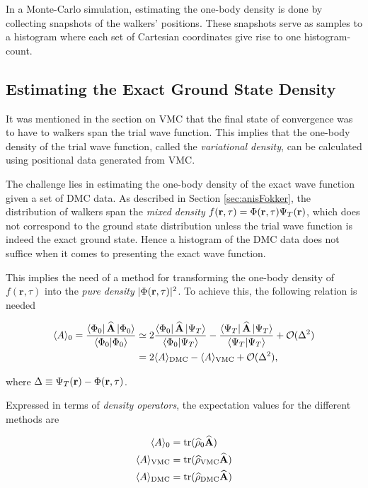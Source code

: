 In a Monte-Carlo simulation, estimating the one-body density is done by collecting snapshots of the walkers' positions. These snapshots serve as samples to a histogram where each set of Cartesian coordinates give rise to one histogram-count.

\subsection{Estimating the Exact Ground State Density}

It was mentioned in the section on VMC that the final state of convergence was to have to walkers span the trial wave function. This implies that the one-body density of the trial wave function, called the \textit{variational density}, can be calculated using positional data generated from VMC.

The challenge lies in estimating the one-body density of the exact wave function given a set of DMC data. As described in Section \ref{sec:anisFokker}, the distribution of walkers span the \textit{mixed density} $f(\mathbf{r}, \tau) = \Phi(\mathbf{r}, \tau)\Psi_T(\mathbf{r})$, which does not correspond to the ground state distribution unless the trial wave function is indeed the exact ground state. Hence a histogram of the DMC data does not suffice when it comes to presenting the exact wave function.

This implies the need of a method for transforming the one-body density of $f(\mathbf{r}, \tau)$ into the \textit{pure density} $|\Phi(\mathbf{r}, \tau)|^2$. To achieve this, the following relation is needed \cite{abInitioMC}

\begin{align}
 \langle A \rangle_0 = \frac{\left< \Phi_0 \right|{\bf\widehat{A}}\left| \Phi_0 \right>}{\left\langle \Phi_0 | \Phi_0\right\rangle} &\simeq  2\frac{\left< \Phi_0 \right|{\bf\widehat{A}}\left| \Psi_T \right>}{\left\langle \Phi_0 | \Psi_T\right\rangle} -  \frac{\left< \Psi_T \right|{\bf\widehat{A}}\left| \Psi_T \right>}{\left\langle \Psi_T | \Psi_T\right\rangle} + \mathcal{O}(\Delta^2)\notag\\
  &= 2\langle A \rangle_\mathrm{DMC} - \langle A \rangle_\mathrm{VMC}  + \mathcal{O}(\Delta^2), \label{eq:PureEstimRelat}
\end{align}

where $\Delta \equiv \Psi_T(\mathbf{r}) - \Phi(\mathbf{r}, \tau)$. 

Expressed in terms of \textit{density operators}, the expectation values for the different methods are \cite{leinaas}

\newcommand{\tr}{\mathrm{tr}}

\begin{align*}
 \langle A \rangle_0 &= \tr(\OP{\rho}_0\OP{A}) \\
 \langle A \rangle_\mathrm{VMC} &= \tr(\OP{\rho}_\mathrm{VMC}\OP{A}) \\
 \langle A \rangle_\mathrm{DMC} &= \tr(\OP{\rho}_\mathrm{DMC}\OP{A}) 
 \end{align*}


